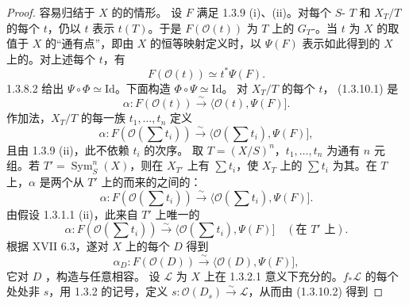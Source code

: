 \begin{proof}
容易归结于 $X$ 的的情形。
设 $F$ 满足 1.3.9 (i)、(ii)。对每个 $S$- $T$ 和 $X_T/T$ 的每个 $t$，仍以 $t$ 表示 $t(T)$。于是 $F(\mathscr O(t))$ 为 $T$ 上的 $G_T$-。当 $t$ 为 $X$ 的取值于 $X$ 的“通有点”，即由 $X$ 的恒等映射定义时，以 $\Psi(F)$ 表示如此得到的 $X$ 上的。对上述每个 $t$，有
\begin{equation}F(\mathscr O(t))\simeq t^*\Psi(F).\tag{1.3.10.1}\end{equation}
 1.3.8.2 给出 $\Psi\circ\Phi\simeq\mathrm{Id}$。下面构造 $\Phi\circ\Psi\simeq\mathrm{Id}$。
对 $X_T/T$ 的每个 $t$， (1.3.10.1) 是
\[\alpha:F(\mathscr O(t))\xrightarrow\sim\langle\mathscr O(t),\Psi(F)].\]
作加法，$X_T/T$ 的每一族 $t_1,\ldots,t_n$ 定义
\[\alpha:F(\mathscr O(\textstyle\sum t_i))\xrightarrow\sim\langle\mathscr O(\textstyle\sum t_i),\Psi(F)],\]
且由 1.3.9 (ii)，此不依赖 $t_i$ 的次序。
取 $T=(X/S)^n$，$t_1,\ldots,t_n$ 为通有 $n$ 元组。若 $T'=\operatorname{Sym}^n_S(X)$，则在 $X_{T'}$ 上有 $\sum t_i$，使 $X_T$ 上的 $\sum t_i$ 为其。在 $T$ 上，$\alpha$ 是两个从 $T'$ 上的而来的之间的：
\[\alpha:F(\mathscr O(\textstyle\sum t_i))\xrightarrow\sim\langle\mathscr O(\textstyle\sum t_i),\Psi(F)].\]
由假设 1.3.1.1 (ii)，此来自 $T'$ 上唯一的
\[\alpha:F(\mathscr O(\textstyle\sum t_i))\xrightarrow\sim\langle\mathscr O(\textstyle\sum t_i),\Psi(F)]\quad(\text{在 }T'\text{ 上}).\]
根据 XVII 6.3，遂对 $X$ 上的每个 $D$ 得到
\begin{equation}\alpha_D:F(\mathscr O(D))\xrightarrow\sim\langle\mathscr O(D),\Psi(F)],\tag{1.3.10.2}\end{equation}
它对 $D$ ，构造与任意相容。
设 $\mathscr L$ 为 $X$ 上在 1.3.2.1 意义下充分的。$f_*\mathscr L$ 的每个处处非 $s$，用 1.3.2 的记号，定义 $s:\mathscr O(D_s)\xrightarrow\sim\mathscr L$，从而由 (1.3.10.2) 得到

\end{proof}
